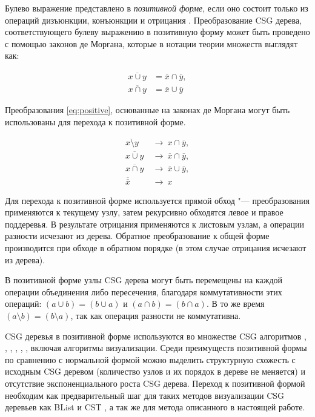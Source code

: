 Булево выражение представлено в \textit{позитивной форме}, если оно состоит только из операций дизъюнкции, конъюнкции и отрицания \cite{rossignac1988active}. Преобразование CSG дерева, соответствующего булеву выражению в позитивную форму может быть проведено с помощью законов де Моргана, которые в нотации теории множеств выглядят как:

\begin{align}
  \overline{x \cup y} & = \overline{x} \cap \overline{y}, \nonumber \\
  \overline{x \cap y} & = \overline{x} \cup \overline{y} \nonumber
\end{align}

Преобразования \ref{eq:positive}, основанные на законах де Моргана могут быть использованы для перехода к позитивной форме.

\begin{equation}
  \label{eq:positive}
  \begin{alignedat}{2}
    x \setminus y \  & \rightarrow \  x \cap \overline{y}, \\
    \overline{x \cup y} \  & \rightarrow \  \overline{x} \cap \overline{y}, \\
    \overline{x\cap y} \  & \rightarrow \  \overline{x} \cup \overline{y}, \\
    \overline{\overline{x}} \  & \rightarrow \  x
  \end{alignedat}
\end{equation}

Для перехода к позитивной форме используется прямой обход "--- преобразования применяются к текущему узлу, затем рекурсивно обходятся левое и правое поддеревья. В результате отрицания применяются к листовым узлам, а операции разности исчезают из дерева. Обратное преобразование к общей форме производится при обходе в обратном порядке (в этом случае отрицания исчезают из дерева).

В позитивной форме узлы CSG дерева могут быть перемещены на каждой операции объединения либо пересечения, благодаря коммутативности этих операций: $(a \cup b) = (b \cup a)$ и $(a \cap b) = (b \cap a)$. В то же время $(a \setminus b) = (b \setminus a)$, так как операция разности не коммутативна.

CSG деревья в позитивной форме используются во множестве CSG алгоритмов \cite{rossignac1988active}, \cite{rossignac1994processing}, \cite{rossignac1999blist}, \cite{cameron1989relationship}, \cite{hable2005blister}, \cite{hable2007cst}, \cite{rossignac2007optimized} включая алгоритмы визуализации. Среди преимуществ позитивной формы по сравнению с нормальной формой можно выделить структурную схожесть с исходным CSG деревом (количество узлов и их порядок в дереве не меняется) и отсутствие экспоненциального роста CSG дерева. Переход к позитивной формой необходим как предварительный шаг для таких методов визуализации CSG деревьев как BList \cite{rossignac1999blist} и CST \cite{hable2007cst}, а так же для метода описанного в настоящей работе.


